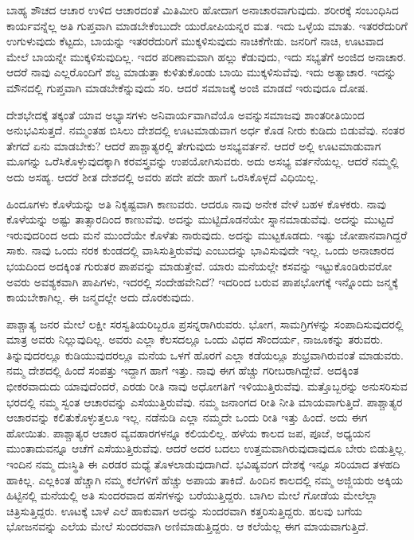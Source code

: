 ಬಾಹ್ಯ ಶೌಚದ ಆಚಾರ ಉಳಿದ ಆಚಾರದಂತೆ ಮಿತಿಮೀರಿ ಹೋದಾಗ ಅನಾಚಾರ\break ವಾಗುವುದು. ಶರೀರಕ್ಕೆ ಸಂಬಂಧಿಸಿದ ಕಾರ್ಯವನ್ನೆಲ್ಲ ಅತಿ ಗುಪ್ತವಾಗಿ ಮಾಡಬೇಕೆಂಬುದೇ ಯುರೋಪಿಯನ್ನರ ಮತ. ಇದು ಒಳ್ಳೆಯ ಮಾತು. ಇತರರೆದುರಿಗೆ ಉಗುಳುವುದು ಕೆಟ್ಟದು, ಬಾಯನ್ನು ಇತರರೆದುರಿಗೆ ಮುಕ್ಕಳಿಸುವುದು ನಾಚಿಕೆಗೇಡು. ಜನರಿಗೆ ನಾಚಿ, ಊಟವಾದ ಮೇಲೆ ಬಾಯನ್ನೇ ಮುಕ್ಕಳಿಸುವುದಿಲ್ಲ. ಇದರ ಪರಿಣಾಮವಾಗಿ ಹಲ್ಲು ಕೆಡುವುದು, ಇದು ಸಭ್ಯತೆಗೆ ಅಂಜಿದ ಅನಾಚಾರ. ಆದರೆ ನಾವು ಎಲ್ಲರೊಂದಿಗೆ ಶಬ್ದ ಮಾಡುತ್ತಾ ಕುಳಿತುಕೊಂಡು ಬಾಯಿ ಮುಕ್ಕಳಿಸುವೆವು. ಇದು ಅತ್ಯಾಚಾರ. ಇದನ್ನು ಮೌನದಲ್ಲಿ ಗುಪ್ತವಾಗಿ ಮಾಡಬೇಕೆನ್ನುವುದು ಸರಿ. ಆದರೆ ಸಮಾಜಕ್ಕೆ ಅಂಜಿ ಮಾಡದೆ ಇರುವುದೂ ದೋಷ.

ದೇಶಭೇದಕ್ಕೆ ತಕ್ಕಂತೆ ಯಾವ ಅಭ್ಯಾಸಗಳು ಅನಿವಾರ್ಯವಾಗಿವೆಯೊ ಅವನ್ನು\break ಸಮಾಜವು ಶಾಂತರೀತಿಯಿಂದ ಅನುಭವಿಸುತ್ತದೆ. ನಮ್ಮಂತಹ ಬಿಸಿಲು ದೇಶದಲ್ಲಿ ಊಟ\break ಮಾಡುವಾಗ ಅರ್ಧ ಕೊಡ ನೀರು ಕುಡಿದು ಬಿಡುವೆವು. ನಂತರ ತೇಗದೆ ಏನು ಮಾಡಬೇಕು? ಆದರೆ ಪಾಶ್ಚಾತ್ಯರಲ್ಲಿ ತೇಗುವುದು ಅಸಭ್ಯವರ್ತನೆ. ಆದರೆ ಅಲ್ಲಿ ಊಟಮಾಡು\break ವಾಗ ಮೂಗನ್ನು ಒರೆಸಿಕೊಳ್ಳುವುದಕ್ಕಾಗಿ ಕರವಸ್ತ್ರವನ್ನು ಉಪಯೋಗಿಸುವರು. ಅದು ಅಸಭ್ಯ ವರ್ತನೆಯಲ್ಲ. ಆದರೆ ನಮ್ಮಲ್ಲಿ ಅದು ಅಸಹ್ಯ. ಆದರೆ ಶೀತ ದೇಶದಲ್ಲಿ ಅವರು ಪದೇ ಪದೇ ಹಾಗೆ ಒರಸಿಕೊಳ್ಳದೆ ವಿಧಿಯಿಲ್ಲ.

ಹಿಂದೂಗಳು ಕೊಳೆಯನ್ನು ಅತಿ ನಿಕೃಷ್ಟವಾಗಿ ಕಾಣುವರು. ಆದರೂ ನಾವು ಅನೇಕ ವೇಳೆ ಬಹಳ ಕೊಳಕರು. ನಾವು ಕೊಳೆಯನ್ನು ಅಷ್ಟು ತಾತ್ಸಾರದಿಂದ ಕಾಣುವೆವು. ಅದನ್ನು ಮುಟ್ಟಿದೊಡನೆಯೇ ಸ್ನಾನಮಾಡುವೆವು. ಅದನ್ನು ಮುಟ್ಟದೆ ಇರುವುದರಿಂದ ಅದು ಮನೆ ಮುಂದೆಯೇ ಕೊಳೆತು ನಾರುವುದು. ಅದನ್ನು ಮುಟ್ಟಕೂಡದು. ಇಷ್ಟು ಜೋಪಾನವಾಗಿದ್ದರೆ ಸಾಕು. ನಾವು ಒಂದು ನರಕ ಕುಂಡದಲ್ಲಿ ವಾಸಿಸುತ್ತಿರುವೆವು ಎಂಬುದನ್ನು ಭಾವಿಸುವುದೇ ಇಲ್ಲ. ಒಂದು ಅನಾಚಾರದ ಭಯದಿಂದ ಅದಕ್ಕಿಂತ ಗುರುತರ ಪಾಪವನ್ನು ಮಾಡುತ್ತೇವೆ. ಯಾರು ಮನೆಯಲ್ಲೇ ಕಸವನ್ನು ಇಟ್ಟುಕೊಂಡಿರುವರೋ ಅವರು ಅವಶ್ಯಕವಾಗಿ ಪಾಪಿಗಳು, ಇದರಲ್ಲಿ ಸಂದೇಹವೇನಿದೆ? ಇದರಿಂದ ಬರುವ ಪಾಪಭೋಗಕ್ಕೆ ಇನ್ನೊಂದು ಜನ್ಮಕ್ಕೆ ಕಾಯಬೇಕಾಗಿಲ್ಲ. ಈ ಜನ್ಮದಲ್ಲೇ ಅದು ದೊರಕುವುದು.

ಪಾಶ್ಚಾತ್ಯ ಜನರ ಮೇಲೆ ಲಕ್ಷೀ ಸರಸ್ವತಿಯರಿಬ್ಬರೂ ಪ್ರಸನ್ನರಾಗಿರುವರು. ಭೋಗ, ಸಾಮಗ್ರಿಗಳನ್ನು ಸಂಪಾದಿಸುವುದರಲ್ಲಿ ಮಾತ್ರ ಅವರು ನಿಲ್ಲುವುದಿಲ್ಲ. ಅವರು ಎಲ್ಲಾ ಕೆಲಸದಲ್ಲೂ ಒಂದು ವಿಧದ ಸೌಂದರ್ಯ, ನಾಜೂಕನ್ನು ತರುವರು. ತಿನ್ನುವುದರಲ್ಲೂ ಕುಡಿಯುವುದರಲ್ಲೂ ಮನೆಯ ಒಳಗೆ ಹೊರಗೆ ಎಲ್ಲಾ ಕಡೆಯಲ್ಲೂ ಶುಭ್ರವಾಗಿರುವಂತೆ ಮಾಡುವರು. ನಮ್ಮ ದೇಶದಲ್ಲಿ ಹಿಂದೆ ಸಂಪತ್ತು ಇದ್ದಾಗ ಹಾಗೆ ಇತ್ತು. ನಾವು ಈಗ ಹೆಚ್ಚು ಗರೀಬರಾಗಿದ್ದೇವೆ. ಅದಕ್ಕಿಂತ ಭೀಕರವಾದುದು ಯಾವುದೆಂದರೆ, ಎರಡು ರೀತಿ ನಾವು ಅಧೋಗತಿಗೆ ಇಳಿಯುತ್ತಿರುವೆವು. ಮತ್ತೊಬ್ಬರನ್ನು ಅನುಸರಿಸುವ ಭರದಲ್ಲಿ ನಮ್ಮ ಸ್ವಂತ ಆಚಾರವನ್ನು ಎಸೆಯುತ್ತಿರುವೆವು. ನಮ್ಮ ಜನಾಂಗದ ರೀತಿ ನೀತಿ ಮಾಯವಾಗುತ್ತಿದೆ. ಪಾಶ್ಚಾತ್ಯರ ಆಚಾರವನ್ನು ಕಲಿತುಕೊಳ್ಳುತ್ತಲೂ ಇಲ್ಲ. ನಡೆನುಡಿ ಎಲ್ಲಾ ನಮ್ಮದೇ ಒಂದು ರೀತಿ ಇತ್ತು ಹಿಂದೆ. ಅದು ಈಗ ಹೋಯಿತು. ಪಾಶ್ಚಾತ್ಯರ ಆಚಾರ ವ್ಯವಹಾರಗಳನ್ನೂ ಕಲಿಯಲಿಲ್ಲ. ಹಳೆಯ ಕಾಲದ ಜಪ, ಪೂಜೆ, ಅಧ್ಯಯನ ಮುಂತಾದುವನ್ನೂ ಆಚೆಗೆ ಎಸೆಯುತ್ತಿರುವೆವು. ಆದರೆ ಅದರ ಬದಲು ಉತ್ತಮವಾಗಿರುವುದಾವುದೂ ಬೇರು ಬಿಡುತ್ತಿಲ್ಲ. ಇಂದಿನ ನಮ್ಮ ದುಃಸ್ಥಿತಿ ಈ ಎರಡರ ಮಧ್ಯೆ ತೊಳಲಾಡುವುದಾಗಿದೆ. ಭವಿಷ್ಯವಂಗ ದೇಶಕ್ಕೆ ಇನ್ನೂ ಸರಿಯಾದ ತಳಹದಿ ಹಾಕಿಲ್ಲ. ಎಲ್ಲಕಿಂತ ಹೆಚ್ಚಾಗಿ ನಮ್ಮ ಕಲೆಗಳಿಗೆ ಹೆಚ್ಚು ಅಪಾಯ ತಾಕಿದೆ. ಹಿಂದಿನ ಕಾಲದಲ್ಲಿ ನಮ್ಮ ಅಜ್ಜಿಯರು ಅಕ್ಕಿಯ ಹಿಟ್ಟಿನಲ್ಲಿ ಮನೆಯಲ್ಲಿ ಅತಿ ಸುಂದರವಾದ ಹಸೆಗಳನ್ನು ಬರೆಯುತ್ತಿದ್ದರು. ಬಾಗಿಲ ಮೇಲೆ ಗೋಡೆಯ ಮೇಲೆಲ್ಲಾ ಚಿತ್ರಿಸುತ್ತಿದ್ದರು. ಊಟಕ್ಕೆ ಬಾಳೆ ಎಲೆ ಹಾಕುವಾಗ ಅದನ್ನು ಸುಂದರವಾಗಿ ಕತ್ತರಿಸುತ್ತಿದ್ದರು. ಹಲವು ಬಗೆಯ ಭೋಜನವನ್ನು ಎಲೆಯ ಮೇಲೆ ಸುಂದರವಾಗಿ ಅಣಿಮಾಡುತ್ತಿದ್ದರು. ಆ ಕಲೆಯೆಲ್ಲ ಈಗ ಮಾಯವಾಗುತ್ತಿದೆ.

